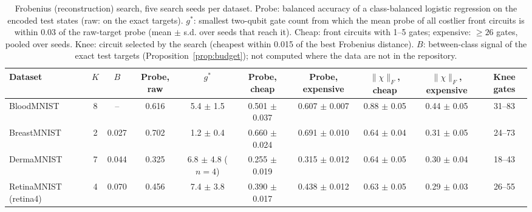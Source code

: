 \begin{table}[t]
\caption{Frobenius (reconstruction) search, five search seeds per dataset. Probe: balanced accuracy of a class-balanced logistic regression on the encoded test states (raw: on the exact targets). $g^\ast$: smallest two-qubit gate count from which the mean probe of all costlier front circuits is within 0.03 of the raw-target probe (mean $\pm$ s.d. over seeds that reach it). Cheap: front circuits with 1--5 gates; expensive: $\ge26$ gates, pooled over seeds. Knee: circuit selected by the search (cheapest within 0.015 of the best Frobenius distance). $B$: between-class signal of the exact test targets (Proposition~\ref{prop:budget}); not computed where the data are not in the repository.}
\label{tab:frobenius}
\begin{ruledtabular}
\begin{tabular}{lccccccccc}
Dataset & $K$ & $B$ & Probe, raw & $g^\ast$ & Probe, cheap & Probe, expensive & $\lVert\chi\rVert_F$, cheap & $\lVert\chi\rVert_F$, expensive & Knee gates\\
\hline
BloodMNIST & 8 & -- & 0.616 & 5.4 $\pm$ 1.5 & 0.501 $\pm$ 0.037 & 0.607 $\pm$ 0.007 & 0.88 $\pm$ 0.05 & 0.44 $\pm$ 0.05 & 31--83\\
BreastMNIST & 2 & 0.027 & 0.702 & 1.2 $\pm$ 0.4 & 0.660 $\pm$ 0.024 & 0.691 $\pm$ 0.010 & 0.64 $\pm$ 0.04 & 0.31 $\pm$ 0.05 & 24--73\\
DermaMNIST & 7 & 0.044 & 0.325 & 6.8 $\pm$ 4.8 ($n=4$) & 0.255 $\pm$ 0.019 & 0.315 $\pm$ 0.012 & 0.64 $\pm$ 0.05 & 0.30 $\pm$ 0.04 & 18--43\\
RetinaMNIST (retina4) & 4 & 0.070 & 0.456 & 7.4 $\pm$ 3.8 & 0.390 $\pm$ 0.017 & 0.438 $\pm$ 0.012 & 0.63 $\pm$ 0.05 & 0.29 $\pm$ 0.03 & 26--55\\
\end{tabular}
\end{ruledtabular}
\end{table}

